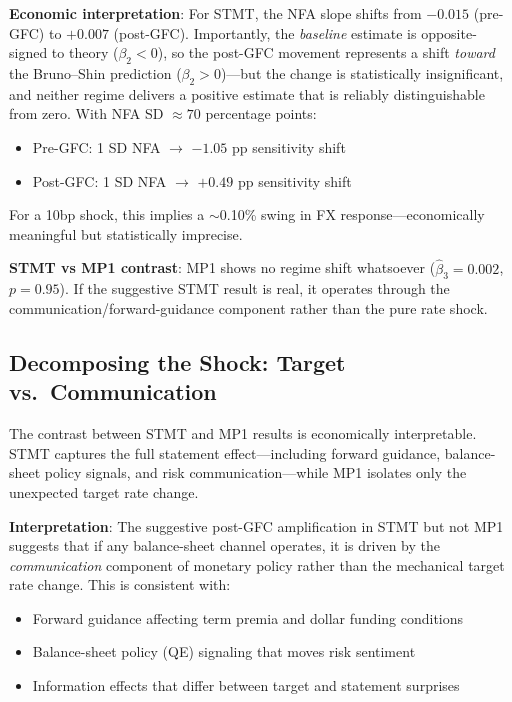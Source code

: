 \documentclass[12pt]{article}
\begin{document}
\textbf{Economic interpretation}: For STMT, the NFA slope shifts from $-0.015$ (pre-GFC) to $+0.007$ (post-GFC). Importantly, the \textit{baseline} estimate is opposite-signed to theory ($\beta_2 < 0$), so the post-GFC movement represents a shift \textit{toward} the Bruno--Shin prediction ($\beta_2 > 0$)---but the change is statistically insignificant, and neither regime delivers a positive estimate that is reliably distinguishable from zero. With NFA SD $\approx 70$ percentage points:
\begin{itemize}
    \item Pre-GFC: 1 SD NFA $\rightarrow$ $-1.05$ pp sensitivity shift
    \item Post-GFC: 1 SD NFA $\rightarrow$ $+0.49$ pp sensitivity shift
\end{itemize}
For a 10bp shock, this implies a $\sim$0.10\% swing in FX response---economically meaningful but statistically imprecise.

\textbf{STMT vs MP1 contrast}: MP1 shows no regime shift whatsoever ($\hat{\beta}_3 = 0.002$, $p = 0.95$). If the suggestive STMT result is real, it operates through the communication/forward-guidance component rather than the pure rate shock.

\subsection{Decomposing the Shock: Target vs.\ Communication}

The contrast between STMT and MP1 results is economically interpretable. STMT captures the full statement effect---including forward guidance, balance-sheet policy signals, and risk communication---while MP1 isolates only the unexpected target rate change.

\textbf{Interpretation}: The suggestive post-GFC amplification in STMT but not MP1 suggests that if any balance-sheet channel operates, it is driven by the \textit{communication} component of monetary policy rather than the mechanical target rate change. This is consistent with:
\begin{itemize}
    \item Forward guidance affecting term premia and dollar funding conditions
    \item Balance-sheet policy (QE) signaling that moves risk sentiment
    \item Information effects that differ between target and statement surprises
\end{itemize}
\end{document}
